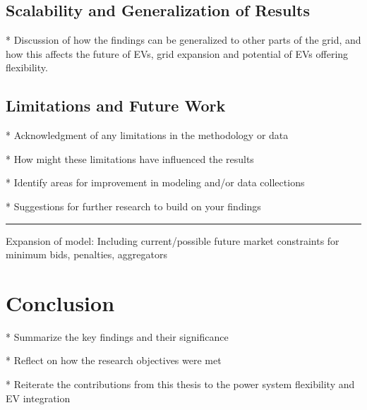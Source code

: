 \subsection{Scalability and Generalization of Results}

* Discussion of how the findings can be generalized to other parts of the grid, and how this affects the future of EVs, grid expansion and potential of EVs offering flexibility. 


\subsection{Limitations and Future Work}

* Acknowledgment of any limitations in the methodology or data

* How might these limitations have influenced the results

* Identify areas for improvement in modeling and/or data collections

* Suggestions for further research to build on your findings

\hrule
Expansion of model: Including current/possible future market constraints for minimum bids, penalties, aggregators


\section{Conclusion}

* Summarize the key findings and their significance

* Reflect on how the research objectives were met

* Reiterate the contributions from this thesis to the power system flexibility and EV integration


